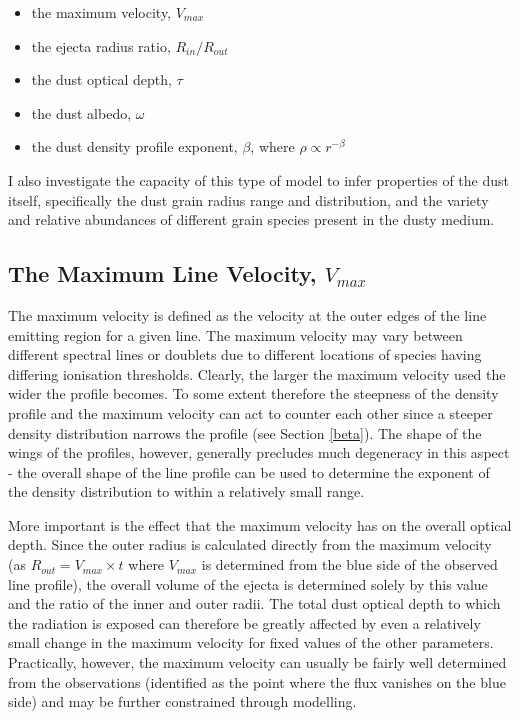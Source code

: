 \begin{itemize}
\item the maximum velocity, $V_{max}$
\item the ejecta radius ratio, $R_{in}/R_{out}$
\item the dust optical depth,  $\tau$
\item the dust albedo, $\omega$ 
\item the dust density profile exponent, $\beta$, where $\rho \propto r^{-\beta}$
\end{itemize}

I also investigate the capacity of this type of model to infer properties of the dust itself, specifically the dust grain radius range and distribution, and the variety and relative abundances of different grain species present in the dusty medium. 


\subsection{The Maximum Line Velocity, $V_{max}$}

The maximum velocity is defined as the velocity at the outer edges of the 
line emitting region for a given line.  The maximum velocity may vary 
between different spectral lines or doublets due to different locations of 
species having differing ionisation thresholds.  Clearly, the larger the 
maximum velocity used the wider the profile becomes.  To some extent 
therefore the steepness of the density profile and the maximum velocity 
can act to counter each other since a steeper density distribution narrows 
the profile (see Section \ref{beta}).  The shape of the wings of the 
profiles, however, generally precludes much degeneracy in this aspect - the 
overall shape of the line profile can be used to determine the exponent of 
the density distribution to within a relatively small range.

More important is the effect that the maximum velocity has on the overall 
optical depth.  Since the outer radius is calculated directly from the 
maximum velocity (as $R_{out}=V_{max} \times t$ where $V_{max}$ is determined from the blue side of the observed line profile), the overall volume of the ejecta is determined solely by 
this value and the ratio of the inner and outer radii.  The total dust 
optical depth to which the radiation is exposed can therefore be greatly 
affected by even a relatively small change in the maximum velocity for 
fixed values of the other parameters.  Practically, however, the maximum 
velocity can usually be fairly well determined from the observations 
(identified as the point where the flux vanishes on the blue side) and may 
be further constrained through modelling.

